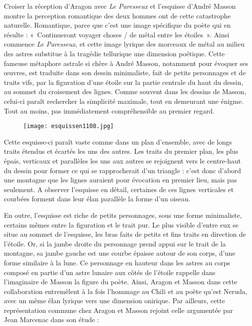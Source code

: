 Croiser la réception d’Aragon avec \emph{Le Paresseux} et l’esquisse d’André Masson montre la perception romantique des deux hommes ont de cette catastrophe naturelle. Romantique, parce que c’est une image spécifique du poète qui en résulte : « Continueront voyager choses / de métal entre les étoiles ». Ainsi commence \emph{Le Paresseux}, et cette image lyrique des morceaux de métal au milieu des astres substitue à la tragédie tellurique une dimension poétique. Cette fameuse métaphore astrale si chère à André Masson, notamment pour évoquer ses \oe{}uvres, est traduite dans son dessin minimaliste, fait de petits personnages et de traits vifs, par la figuration d’une étoile sur la partie centrale du haut du dessin, au sommet du croisement des lignes. Comme souvent dans les dessins de Masson, celui-ci paraît rechercher la simplicité maximale, tout en demeurant une énigme. Tout au moins, pas immédiatement compréhensible au premier regard. 

\begin{figure}[H]
   \centering
   \texttt{[image: esquissen1108.jpg]}
	\caption{\cite{pabloneruda}}\label{fig:MassonNeruda}
\end{figure}

	Cette esquisse-ci paraît vaste comme dans un plan d’ensemble, avec de longs traits étendus et écartés les uns des autres. Les traits du premier plan, les plus épais, verticaux et parallèles les uns aux autres se rejoignent vers le centre-haut du dessin pour former ce qui se rapprocherait d’un triangle : c’est donc d’abord une montagne que les lignes auraient pour évocation en premier lieu, mais pas seulement. A observer l’esquisse en détail, certaines de ces lignes verticales et courbées forment dans leur élan parallèle la forme d’un oiseau. 

En outre, l’esquisse est riche de petits personnages, sous une forme minimaliste, certains mêmes entre la figuration et le trait pur. Le plus visible d’entre eux se situe au sommet de l’esquisse, les bras faits de petits et fins traits en direction de l’étoile. Or, si la jambe droite du personnage prend appui sur le trait de la montagne, sa jambe gauche est une courbe épaisse autour de son corps, d’une forme similaire à la lune. Ce personnage en hauteur dans les astres au corps composé en partie d’un astre lunaire aux côtés de l’étoile rappelle dans l’imaginaire de Masson la figure du poète. Ainsi, Aragon et Masson dans cette collaboration entremêlent à la fois l’hommage au Chili et au poète qu’est Neruda, avec un même élan lyrique vers une dimension onirique. Par ailleurs, cette représentation commune chez Aragon et Masson rejoint celle argumentée par Jean Marcenac dans son étude :

